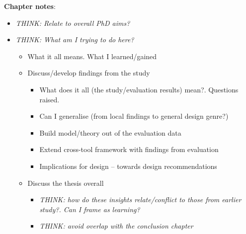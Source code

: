 
\textbf{Chapter notes}:
\begin{itemize}

	\item \textit{THINK: Relate to overall PhD aims?}
	
	\item \textit{THINK: What am I trying to do here?}
	\begin{itemize}
	
		\item What it all means.  What I learned/gained
	
		\item Discuss/develop findings from the study
		\begin{itemize}
			\item What does it all (the study/evaluation results) mean?. Questions raised.
			\item Can I generalise (from local findings to general design genre?)
			\item Build model/theory out of the evaluation data
			\item Extend cross-tool framework with findings from evaluation
			\item Implications for design -- towards design recommendations
		\end{itemize}

		
		\item Discuss the thesis overall
		\begin{itemize}
			\item \textit{THINK: how do these insights relate/conflict to those from earlier study?. Can I frame as learning?}
			\item \textit{THINK: avoid overlap with the conclusion chapter}
		\end{itemize}

	\end{itemize}
	

\end{itemize}
